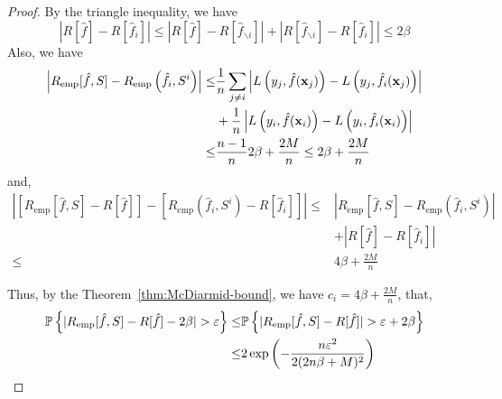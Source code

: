 \begin{proof}
	By the triangle inequality, we have
	\begin{equation}
		\left|R[\hat{f}]-R[\hat{f}_{i}]\right|\leq\left|R[\hat{f}]-R[\hat{f}_{\backslash i}]\right|+\left|R[\hat{f}_{\backslash i}]-R[\hat{f}_{i}]\right|\leq 2\beta
	\end{equation}
	Also, we have
	\begin{equation}
		\begin{aligned}
			\left|R_{\text{emp}}[\hat{f},S]-R_{\text{emp}}\left(\hat{f}_{i},S^{i}\right)\right|\leq & \frac{1}{n}\sum_{j\neq i}\left|L\left(y_{j},\hat{f}(\mathbf{x}_{j})\right)-L\left(y_{j},\hat{f}_{i}(\mathbf{x}_{j})\right)\right| \\
			                                                                                        & +\frac{1}{n}\left|L\left(y_{i},\hat{f}(\mathbf{x}_{i})\right)-L\left(y_{i},\hat{f}_{i}(\mathbf{x}_{i})\right)\right|              \\
			\leq                                                                                    & \frac{n-1}{n}2\beta+\frac{2M}{n}\leq 2\beta+\frac{2M}{n}
		\end{aligned}
	\end{equation}
	and,
	\begin{equation}
		\begin{aligned}
			\left|\left[R_{\text{emp}}[\hat{f},S]-R[\hat{f}]\right]-\left[R_{\text{emp}}\left(\hat{f}_{i},S^{i}\right)-R[\hat{f}_{i}]\right]\right|\leq & \left|R_{\text{emp}}[\hat{f},S]-R_{\text{emp}}\left(\hat{f}_{i},S^{i}\right)\right| \\
			                                                                                                                                            & +\left|R[\hat{f}]-R[\hat{f}_{i}]\right|                                             \\
			\leq                                                                                                                                        & 4\beta+\frac{2M}{n}
		\end{aligned}
	\end{equation}

	Thus, by the Theorem~\ref{thm:McDiarmid-bound}, we have \(c_{i}=4\beta+\frac{2M}{n}\), that,
	\begin{equation}
		\begin{aligned}
			\bbP\left\{|R_{\text{emp}}[\hat{f},S]-R[\hat{f}]-2\beta|>\varepsilon\right\}\leq & \bbP\left\{|R_{\text{emp}}[\hat{f},S]-R[\hat{f}]|>\varepsilon+2\beta\right\} \\
			\leq                                                                                   & 2\exp\left(-\frac{n\varepsilon^{2}}{2(2n\beta+M)^{2}}\right)
		\end{aligned}
	\end{equation}
\end{proof}

